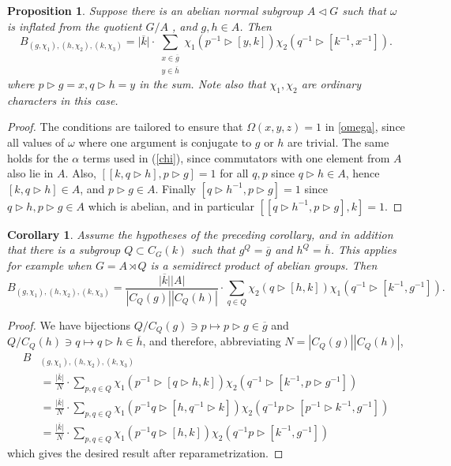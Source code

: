 \documentclass[11pt]{book}
\newtheorem{Prop}[theorem]{Proposition}
\newtheorem{Cor}[theorem]{Corollary}
\theoremstyle{Rem}
\theoremstyle{definition}
\numberwithin{equation}{section}
\newcommand\ol[1]{\overline{#1}}
\newcommand\hit{\triangleright}
\newcommand\inv{^{-1}}
\newcommand\semdir{\rtimes}
\begin{document}
\begin{Prop} Suppose there is an abelian normal subgroup $A\triangleleft G$ such that  $\omega$ is inflated from the quotient $G/A$ , and $g,h\in A$. Then
  \begin{equation}
    \label{eq:simplified}
    B_{(g,\chi_1),(h,\chi_2),(k,\chi_3)}=\vert \overline k \vert \cdot \sum_{\substack{x\in \overline g\\y\in\overline h}}\chi_1(p\inv\hit[y,k])\chi_2(q\inv\hit[k\inv,x\inv]).
  \end{equation}
  where $p\hit g=x,q\hit h=y$ in the sum. Note also that $\chi_1,\chi_2$ are ordinary characters in this case.
\end{Prop}
\begin{proof}
  The conditions are tailored to ensure that $\Omega(x,y,z)=1$ in \ref{omega}, since all values of $\omega$ where one argument is conjugate to $g$ or $h$ are trivial. The same holds for the $\alpha$ terms used in (\cref{chi}), since commutators with one element from $A$ also lie in $A$. Also, $[[k,q\hit h],p\hit g]=1$ for all $q,p$ since $q\hit h\in A$, hence $[k,q\hit h]\in A$, and $p\hit g\in A$. Finally $[q\hit h\inv,p\hit g]=1$ since $q\hit h,p\hit g\in A$ which is abelian, and in particular $[[q\hit h\inv,p\hit g],k]=1$.
\end{proof}
\begin{Cor}\label{Cor:verysimplified}
  Assume the hypotheses of the preceding corollary, and in addition that there is a subgroup $Q\subset C_G(k)$ such that $g^Q=\overline g$ and $h^Q=\overline h$. This applies for example when $G=A\semdir Q$ is a semidirect product of abelian groups. Then
  \begin{equation}
    \label{eq:verysimplified}
    B_{(g,\chi_1),(h,\chi_2),(k,\chi_3)}=\frac{\vert \ol k \vert |A|}{|C_Q(g)||C_Q(h)|} \cdot\sum_{q\in Q}\chi_2(q\hit[h,k])\chi_1(q\inv\hit[k\inv,g\inv]).
  \end{equation}
\end{Cor}
\begin{proof}
  We have bijections $Q/C_Q(g)\ni p\mapsto p\hit g\in \ol g$ and $Q/C_Q(h)\ni q\mapsto q\hit h\in \ol h$, and therefore, abbreviating $N=|C_Q(g)||C_Q(h)|$,
  \begin{align*}
    B&_{(g,\chi_1),(h,\chi_2),(k,\chi_3)}\\&=\frac{\vert\ol k  \vert}N \cdot \sum_{p,q\in Q}\chi_1(p\inv\hit[q\hit h,k])\chi_2(q\inv\hit[k\inv,p\hit g\inv])\\
                                        &=\frac{\vert\ol k  \vert}N \cdot\sum_{p,q\in Q}\chi_1(p\inv q\hit[h,q\inv\hit k])\chi_2(q\inv p\hit[p\inv \hit k\inv,g\inv])\\
                                        &=\frac{\vert\ol k  \vert}N\cdot\sum_{p,q\in Q}\chi_1(p\inv q\hit[h,k])\chi_2(q\inv p\hit[k\inv,g\inv])
  \end{align*}
  which gives the desired result after reparametrization.
\end{proof}
\end{document}
